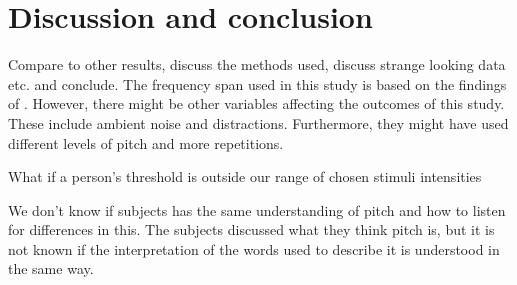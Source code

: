 \section*{Discussion and conclusion} 
Compare to other results, discuss the methods used, discuss strange looking data etc. and conclude.
The frequency span used in this study is based on the findings of \citep{Wier1977}. However, there might be other variables affecting the outcomes of this study. These include ambient noise and distractions. Furthermore, they might have used different levels of pitch and more repetitions.

What if a person’s threshold is outside our range of chosen stimuli intensities 

We don’t know if subjects has the same understanding of pitch and how to listen for differences in this. The subjects discussed what they think pitch is, but it is not known if the interpretation of the words used to describe it is understood in the same way.





 
